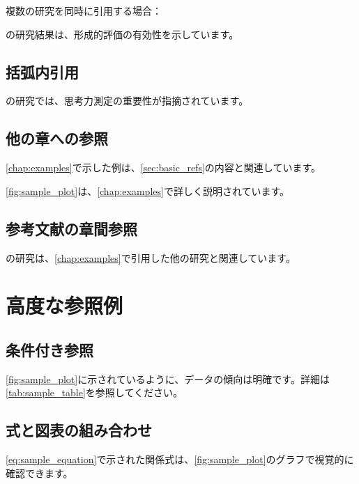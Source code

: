 \documentclass[../main/main.tex]{subfiles}
\begin{document}
複数の研究を同時に引用する場合：

\parencite{Black1998-yt,arai2020japanese}の研究結果は、形成的評価の有効性を示しています。

\subsection{括弧内引用}

\parencite{arai2020japanese}の研究では、思考力測定の重要性が指摘されています。



\subsection{他の章への参照}

\cref{chap:examples}で示した例は、\cref{sec:basic_refs}の内容と関連しています。

\cref{fig:sample_plot}は、\cref{chap:examples}で詳しく説明されています。

\subsection{参考文献の章間参照}

\textcite{arai2020japanese}の研究は、\cref{chap:examples}で引用した他の研究\parencite{Black1998-yt}と関連しています。

\section{高度な参照例}

\subsection{条件付き参照}

\cref{fig:sample_plot}に示されているように、データの傾向は明確です。詳細は\cref{tab:sample_table}を参照してください。

\subsection{式と図表の組み合わせ}

\cref{eq:sample_equation}で示された関係式は、\cref{fig:sample_plot}のグラフで視覚的に確認できます。
\end{document}
